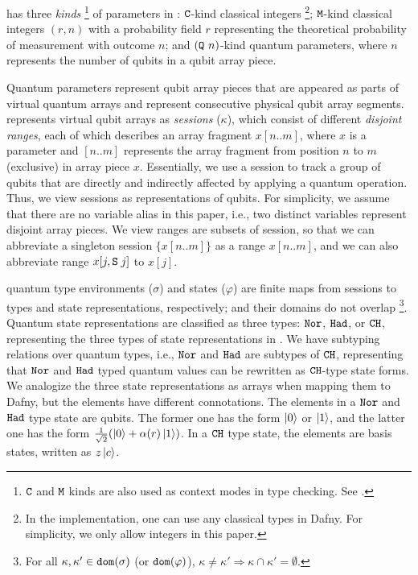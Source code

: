 \qafny has three \emph{kinds} \footnote{$\texttt{C}$ and $\texttt{M}$ kinds are also used as context modes in type checking. See . } of parameters in : $\texttt{C}$-kind classical integers \footnote{In the \qafny implementation, one can use any classical types in Dafny. For simplicity, we only allow integers in this paper.}; 
$\texttt{M}$-kind classical integers $(r,n)$ with a probability field $r$ representing the theoretical probability of measurement with outcome $n$; and $(\texttt{Q}~n)$-kind quantum parameters, where $n$ represents the number of qubits in a qubit array piece.

Quantum parameters represent qubit array pieces that are appeared as parts of virtual quantum arrays and represent consecutive physical qubit array segments. \qafny represents virtual qubit arrays as \emph{sessions} ($\kappa$), which consist of different \emph{disjoint ranges}, each of which describes an array fragment $x[n..m]$, where $x$ is a parameter and $[n..m]$ represents the array fragment from position $n$ to $m$ (exclusive) in array piece $x$. 
Essentially, we use a session to track a group of qubits that are directly and indirectly affected by applying a quantum operation.
Thus, we view sessions as representations of qubits.
For simplicity, we assume that there are no variable alias in this paper, i.e., two distinct variables represent disjoint array pieces. We view ranges are subsets of session, so that we can abbreviate a singleton session $\{x[n..m]\}$ as a range $x[n..m]$, and we can also abbreviate range $x[j,\texttt{S}\;j]$ to $x[j]$.

\qafny quantum type environments ($\sigma$) and states ($\varphi$) are finite maps from sessions to types and state representations, respectively; and their domains do not overlap \footnote{ For all $\kappa, \kappa' \in \mathtt{dom}(\sigma)$ (or $\mathtt{dom}(\varphi)$), $\kappa \neq \kappa' \Rightarrow \kappa \cap \kappa' = \emptyset$.}.
Quantum state representations are classified as three types: $\texttt{Nor}$, $\texttt{Had}$, or $\texttt{CH}$, representing the three types of state representations in . We have subtyping relations over quantum types, i.e., $\texttt{Nor}$ and $\texttt{Had}$ are subtypes of $\texttt{CH}$, representing that $\texttt{Nor}$ and $\texttt{Had}$ typed quantum values can be rewritten as $\texttt{CH}$-type state forms. 
We analogize the three state representations as arrays when mapping them to Dafny, but the elements have different connotations.
The elements in a $\texttt{Nor}$ and $\texttt{Had}$ type state are qubits. The former one has the form $\left\vert{0}\right\rangle$ or $\left\vert{1}\right\rangle$, and the latter one has the form $\frac{1}{\sqrt{2}}(\left\vert{0}\right\rangle+\alpha(r)\left\vert{1}\right\rangle)$.
In a $\texttt{CH}$ type state, the elements are basis states, written as $z\left\vert{c}\right\rangle$.

